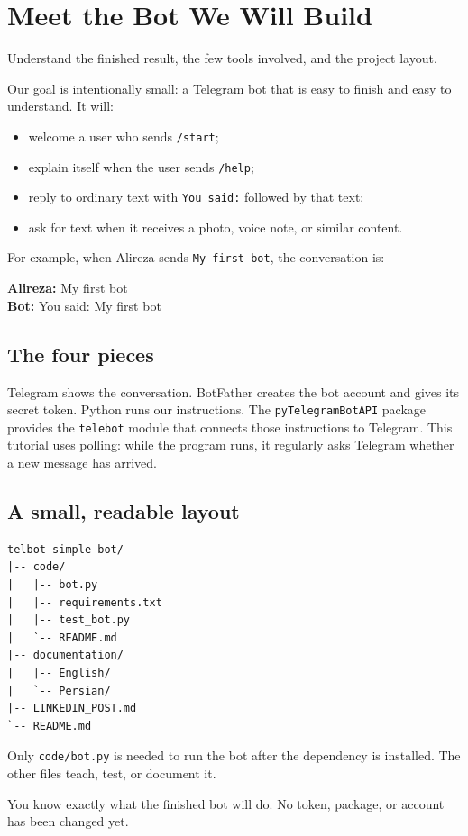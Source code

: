 \chapter{Meet the Bot We Will Build}

\begin{goalbox}
Understand the finished result, the few tools involved, and the project layout.
\end{goalbox}

Our goal is intentionally small: a Telegram bot that is easy to finish and easy
to understand. It will:

\begin{itemize}
\item welcome a user who sends \texttt{/start};
\item explain itself when the user sends \texttt{/help};
\item reply to ordinary text with \texttt{You said:} followed by that text;
\item ask for text when it receives a photo, voice note, or similar content.
\end{itemize}

For example, when Alireza sends \texttt{My first bot}, the conversation is:

\begin{resultbox}
\textbf{Alireza:} My first bot\\
\textbf{Bot:} You said: My first bot
\end{resultbox}

\section{The four pieces}

Telegram shows the conversation. BotFather creates the bot account and gives its
secret token. Python runs our instructions. The \texttt{pyTelegramBotAPI}
package provides the \texttt{telebot} module that connects those instructions to
Telegram. This tutorial uses polling: while the program runs, it regularly asks
Telegram whether a new message has arrived.

\section{A small, readable layout}

\begin{lstlisting}[language={},numbers=none]
telbot-simple-bot/
|-- code/
|   |-- bot.py
|   |-- requirements.txt
|   |-- test_bot.py
|   `-- README.md
|-- documentation/
|   |-- English/
|   `-- Persian/
|-- LINKEDIN_POST.md
`-- README.md
\end{lstlisting}

Only \texttt{code/bot.py} is needed to run the bot after the dependency is
installed. The other files teach, test, or document it.

\begin{checkpointbox}
You know exactly what the finished bot will do. No token, package, or account has
been changed yet.
\end{checkpointbox}
